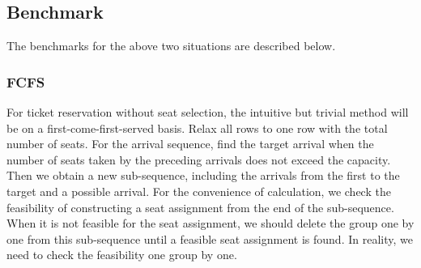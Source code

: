 







\subsection{Benchmark}
 
The benchmarks for the above two situations are described below.

\subsubsection{FCFS}\label{FCFS-based}
For ticket reservation without seat selection, the intuitive but trivial method will be on a first-come-first-served basis. Relax all rows to one row with the total number of seats. For the arrival sequence, find the target arrival when the number of seats taken by the preceding arrivals does not exceed the capacity. 
Then we obtain a new sub-sequence, including the arrivals from the first to the target and a possible arrival. For the convenience of calculation, we check the feasibility of constructing a seat assignment from the end of the sub-sequence. When it is not feasible for the seat assignment, we should delete the group one by one from this sub-sequence until a feasible seat assignment is found. In reality, we need to check the feasibility one group by one. 


